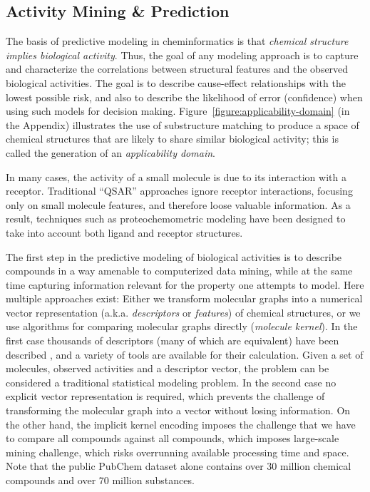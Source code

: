 \documentclass{sig-alternate}
\begin{document}
\subsection{Activity Mining \& Prediction}
\label{sec:activity-mining}


The basis of predictive modeling in cheminformatics is that
\emph{chemical structure implies biological activity}. Thus, the goal
of any modeling approach is to capture and characterize the
correlations between structural features and the observed biological
activities. The goal is to describe cause-effect relationships with
the lowest possible risk, and also to describe the likelihood of error
(confidence) when using such models for decision making.  Figure~\ref{figure:applicability-domain} (in the Appendix) illustrates the use of substructure matching to produce a space of chemical structures that are likely to share similar biological activity; this is called the generation of an \emph{applicability domain}.

In many cases, the activity of a small molecule is due to its interaction with
a receptor. Traditional ``QSAR'' approaches ignore receptor interactions,
focusing only on small molecule features, and therefore loose valuable
information. As a result, techniques such as proteochemometric
modeling have been designed to take into account both ligand and
receptor structures.

The first step in the predictive modeling of biological activities is
to describe compounds in a way amenable to computerized data mining, while at the same time capturing information
relevant for the property one attempts to model. Here multiple approaches exist: Either we transform molecular graphs
into a
numerical vector representation (a.k.a. \emph{descriptors} or
\emph{features}) of chemical structures, or we use algorithms for
comparing molecular graphs directly (\emph{molecule kernel}). In the
first case thousands of descriptors (many of which are equivalent)
have been described \cite{todeschini2000},
and a variety of tools are available for their calculation. Given a
set of molecules, observed activities and a descriptor vector, the
problem can be considered a traditional statistical modeling
problem. In the second case no explicit vector representation is
required, which prevents the challenge of transforming the molecular
graph into a vector without losing information. On the other hand, the
implicit kernel encoding imposes the challenge that we have to compare all compounds against
all compounds, which imposes large-scale mining challenge, which risks overrunning available
processing time and space. Note that the public PubChem dataset alone
contains over 30 million chemical compounds and over 70 million substances.
\end{document}

